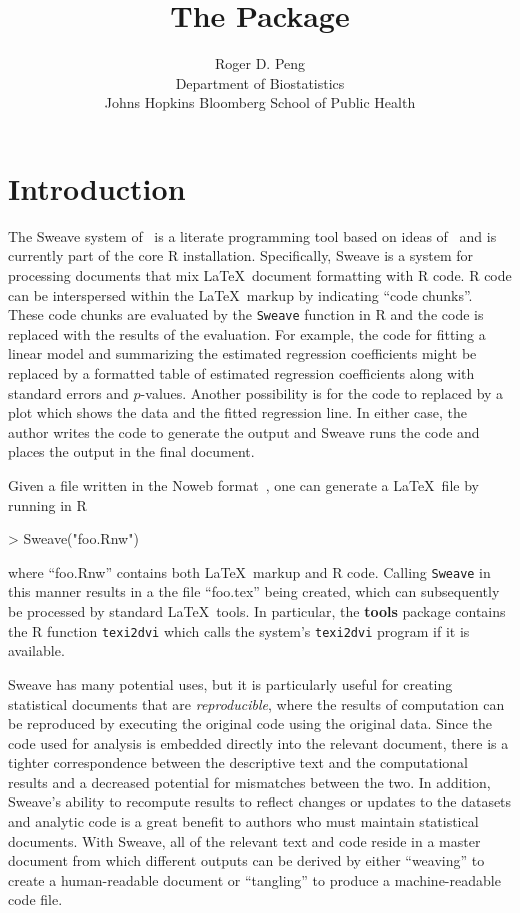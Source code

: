 \documentclass{article}
\author{Roger D. Peng\\Department of Biostatistics\\Johns Hopkins Bloomberg School of Public Health}
\title{The \pkg{cacheSweave} Package}
\newcommand{\proglang}{\textsf}
\newcommand{\code}{\texttt}
\newcommand{\pkg}{\textbf}
\begin{document}

\maketitle

\section{Introduction}

The Sweave system of~\cite{leis:2002} is a literate programming tool
based on ideas of~\cite{knut:1984} and is currently part of the core
\proglang{R} installation.  Specifically, Sweave is a system for
processing documents that mix \LaTeX\ document formatting with
\proglang{R} code.  \proglang{R} code can be interspersed within the
\LaTeX\ markup by indicating ``code chunks''.  These code chunks are
evaluated by the \code{Sweave} function in \proglang{R} and the code
is replaced with the results of the evaluation.  For example, the code
for fitting a linear model and summarizing the estimated regression
coefficients might be replaced by a formatted table of estimated
regression coefficients along with standard errors and $p$-values.
Another possibility is for the code to replaced by a plot which shows
the data and the fitted regression line.  In either case, the author
writes the code to generate the output and Sweave runs the code and
places the output in the final document.

Given a file written in the Noweb format~\citep{rams:1994}, one can
generate a \LaTeX\ file by running in \proglang{R}
\begin{Schunk}
\begin{Sinput}
> Sweave("foo.Rnw")
\end{Sinput}
\end{Schunk}
where ``foo.Rnw'' contains both \LaTeX\ markup and \proglang{R} code.
Calling \code{Sweave} in this manner results in a the file ``foo.tex''
being created, which can subsequently be processed by standard
\LaTeX\ tools.  In particular, the \pkg{tools} package contains the
\proglang{R} function \code{texi2dvi} which calls the system's
\code{texi2dvi} program if it is available.

Sweave has many potential uses, but it is particularly useful for
creating statistical documents that are \textit{reproducible}, where
the results of computation can be reproduced by executing the original
code using the original data.  Since the code used for analysis is
embedded directly into the relevant document, there is a tighter
correspondence between the descriptive text and the computational
results and a decreased potential for mismatches between the two.  In
addition, Sweave's ability to recompute results to reflect changes or
updates to the datasets and analytic code is a great benefit to
authors who must maintain statistical documents.  With Sweave, all of
the relevant text and code reside in a master document from which
different outputs can be derived by either ``weaving'' to create a
human-readable document or ``tangling'' to produce a machine-readable
code file.
\end{document}
